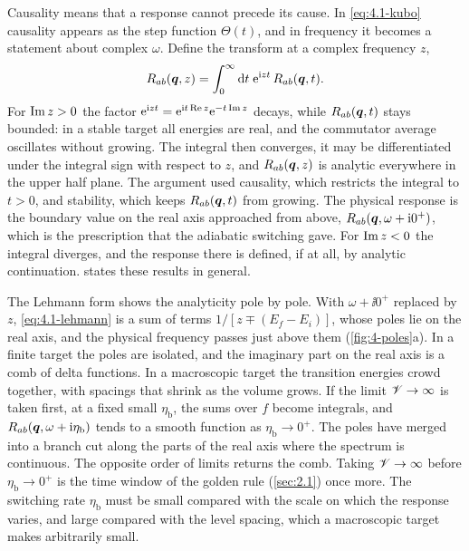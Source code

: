 Causality means that a response cannot precede its cause. In \cref{eq:4.1-kubo} causality appears as the step function $\Theta(t)$, and in frequency it becomes a statement about complex $\omega$. Define the transform at a complex frequency $z$,
\begin{equation}
  R_{ab}(\bm{q},z) = \int_0^\infty\mathrm{d} t\;\mathrm{e}^{\mathrm{i} zt}\,R_{ab}(\bm{q},t) .
  \label{eq:4.1-Rz}
\end{equation}
For $\operatorname{Im} z > 0$ the factor $\mathrm{e}^{\mathrm{i} zt} = \mathrm{e}^{\mathrm{i} t\operatorname{Re} z}\mathrm{e}^{-t\operatorname{Im} z}$ decays, while $R_{ab}(\bm{q},t)$ stays bounded: in a stable target all energies are real, and the commutator average oscillates without growing. The integral then converges, it may be differentiated under the integral sign with respect to $z$, and $R_{ab}(\bm{q},z)$ is analytic everywhere in the upper half plane. The argument used causality, which restricts the integral to $t > 0$, and stability, which keeps $R_{ab}(\bm{q},t)$ from growing. The physical response is the boundary value on the real axis approached from above, $R_{ab}(\bm{q},\omega + \mathrm{i}0^+)$, which is the prescription that the adiabatic switching gave. For $\operatorname{Im} z < 0$ the integral diverges, and the response there is defined, if at all, by analytic continuation.  states these results in general.

The Lehmann form shows the analyticity pole by pole. With $\omega + \ii0^+$ replaced by $z$, \cref{eq:4.1-lehmann} is a sum of terms $1/[z \mp (E_f - E_i)]$, whose poles lie on the real axis, and the physical frequency passes just above them (\cref{fig:4-poles}a). In a finite target the poles are isolated, and the imaginary part on the real axis is a comb of delta functions. In a macroscopic target the transition energies crowd together, with spacings that shrink as the volume grows. If the limit $\mathscr{V} \to \infty$ is taken first, at a fixed small $\eta_{\mathrm{b}}$, the sums over $f$ become integrals, and $R_{ab}(\bm{q},\omega + \mathrm{i}\eta_{\mathrm{b}})$ tends to a smooth function as $\eta_{\mathrm{b}} \to 0^+$. The poles have merged into a branch cut along the parts of the real axis where the spectrum is continuous. The opposite order of limits returns the comb. Taking $\mathscr{V} \to \infty$ before $\eta_{\mathrm{b}} \to 0^+$ is the time window of the golden rule (\cref{sec:2.1}) once more. The switching rate $\eta_{\mathrm{b}}$ must be small compared with the scale on which the response varies, and large compared with the level spacing, which a macroscopic target makes arbitrarily small.


